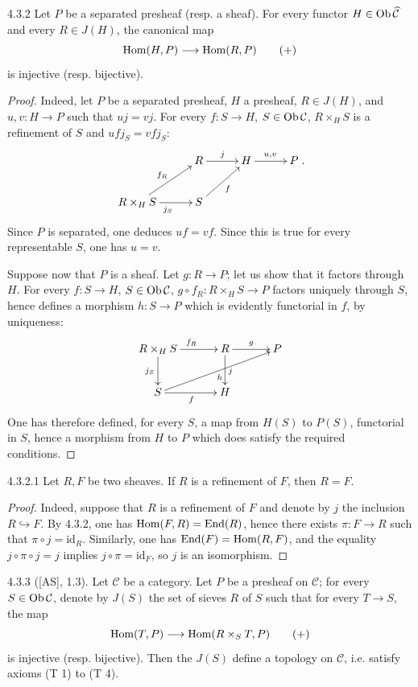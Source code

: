\begin{proposition}{4.3.2}\label{IV.4.3.2}
Let \(P\) be a separated presheaf (resp. a sheaf). For every functor
\(H\in\operatorname{Ob}\widehat{\mathcal C}\) and every \(R\in J(H)\), the canonical map
\[
\operatorname{Hom}(H,P)\longrightarrow\operatorname{Hom}(R,P)\tag{+}
\]
is injective (resp. bijective).
\end{proposition}
\begin{proof}
Indeed, let \(P\) be a separated presheaf, \(H\) a presheaf, \(R\in J(H)\),
and \(u,v:H\to P\) such that \(uj=vj\). For every \(f:S\to H\),
\(S\in\operatorname{Ob}\mathcal C\), \(R\times_H S\) is a refinement of \(S\) and
\(ufj_S=vfj_S\):
\[
\xymatrix@C=2.8em@R=2.3em{
 & R\ar[r]^j & H\ar[r]^{u,v} & P\\
 R\times_H S\ar[ur]^{f_R}\ar[r]_{j_S} & S\ar[ur]_f & & }.
\]
Since \(P\) is separated, one deduces \(uf=vf\). Since this is true for
every representable \(S\), one has \(u=v\).

Suppose now that \(P\) is a sheaf. Let \(g:R\to P\); let us show that it
factors through \(H\). For every \(f:S\to H\), \(S\in\operatorname{Ob}\mathcal C\),
\(g\circ f_R:R\times_H S\to P\) factors uniquely through \(S\), hence
defines a morphism \(h:S\to P\) which is evidently functorial in \(f\),
by uniqueness:
\[
\xymatrix@C=3.2em@R=2.5em{
R\times_H S\ar[r]^{f_R}\ar[d]_{j_S} & R\ar[r]^g\ar[d]^j & P\\
S\ar[r]_f\ar[urr]_h & H & }
\]
One has therefore defined, for every \(S\), a map from \(H(S)\) to \(P(S)\),
functorial in \(S\), hence a morphism from \(H\) to \(P\) which does satisfy
the required conditions.
\end{proof}

\begin{corollary}{4.3.2.1}\label{IV.4.3.2.1}
Let \(R,F\) be two sheaves. If \(R\) is a refinement of \(F\), then \(R=F\).
\end{corollary}
\begin{proof}
Indeed, suppose that \(R\) is a refinement of \(F\) and denote by \(j\)
the inclusion \(R\hookrightarrow F\). By 4.3.2, one has
\(\operatorname{Hom}(F,R)=\operatorname{End}(R)\), hence there exists \(\pi:F\to R\) such that
\(\pi\circ j=\mathrm{id}_R\). Similarly, one has
\(\operatorname{End}(F)=\operatorname{Hom}(R,F)\), and the equality \(j\circ\pi\circ j=j\)
implies \(j\circ\pi=\mathrm{id}_F\), so \(j\) is an isomorphism.
\end{proof}

\begin{proposition}{4.3.3}\label{IV.4.3.3}
\textup{([AS], 1.3).}
Let \(\mathcal C\) be a category. Let \(P\) be a presheaf on \(\mathcal C\);
for every \(S\in\operatorname{Ob}\mathcal C\), denote by \(J(S)\) the set of sieves \(R\)
of \(S\) such that for every \(T\to S\), the map
\[
\operatorname{Hom}(T,P)\longrightarrow\operatorname{Hom}(R\times_S T,P)\tag{+}
\]
is injective (resp. bijective). Then the \(J(S)\) define a topology on
\(\mathcal C\), i.e. satisfy axioms (T 1) to (T 4).
\end{proposition}

